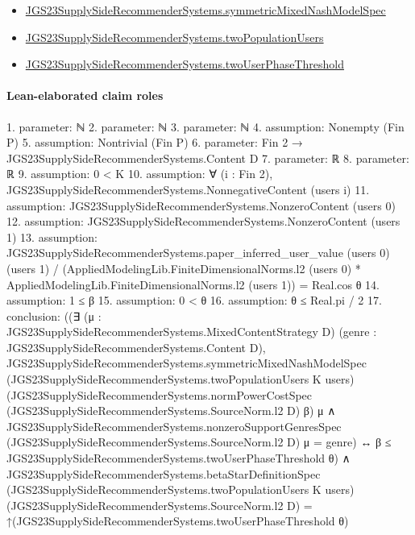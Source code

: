 \documentclass[10pt]{article}
\begin{document}
\begin{itemize}
\item \hyperlink{paper-prerequisite-b412efba7deb757f}{JGS23\allowbreak{}Supply\allowbreak{}Side\allowbreak{}Recommender\allowbreak{}Systems.\allowbreak{}symmetric\allowbreak{}Mixed\allowbreak{}Nash\allowbreak{}Model\allowbreak{}Spec}
\item \hyperlink{governing-declaration-43b84bc2140424db}{JGS23\allowbreak{}Supply\allowbreak{}Side\allowbreak{}Recommender\allowbreak{}Systems.\allowbreak{}two\allowbreak{}Population\allowbreak{}Users}
\item \hyperlink{governing-declaration-63bdc0df0d11c740}{JGS23\allowbreak{}Supply\allowbreak{}Side\allowbreak{}Recommender\allowbreak{}Systems.\allowbreak{}two\allowbreak{}User\allowbreak{}Phase\allowbreak{}Threshold}
\end{itemize}
\paragraph{Lean-elaborated claim roles}\begin{ReviewVerbatim}
1. parameter: ℕ
2. parameter: ℕ
3. parameter: ℕ
4. assumption: Nonempty (Fin P)
5. assumption: Nontrivial (Fin P)
6. parameter: Fin 2 → JGS23SupplySideRecommenderSystems.Content D
7. parameter: ℝ
8. parameter: ℝ
9. assumption: 0 < K
10. assumption: ∀ (i : Fin 2), JGS23SupplySideRecommenderSystems.NonnegativeContent (users i)
11. assumption: JGS23SupplySideRecommenderSystems.NonzeroContent (users 0)
12. assumption: JGS23SupplySideRecommenderSystems.NonzeroContent (users 1)
13. assumption: JGS23SupplySideRecommenderSystems.paper_inferred_user_value (users 0) (users 1) /
    (AppliedModelingLib.FiniteDimensionalNorms.l2 (users 0) * AppliedModelingLib.FiniteDimensionalNorms.l2 (users 1)) =
  Real.cos θ
14. assumption: 1 ≤ β
15. assumption: 0 < θ
16. assumption: θ ≤ Real.pi / 2
17. conclusion: ((∃ (μ : JGS23SupplySideRecommenderSystems.MixedContentStrategy D) (genre :
      JGS23SupplySideRecommenderSystems.Content D),
      JGS23SupplySideRecommenderSystems.symmetricMixedNashModelSpec
          (JGS23SupplySideRecommenderSystems.twoPopulationUsers K users)
          (JGS23SupplySideRecommenderSystems.normPowerCostSpec (JGS23SupplySideRecommenderSystems.SourceNorm.l2 D) β)
          μ ∧
        JGS23SupplySideRecommenderSystems.nonzeroSupportGenresSpec (JGS23SupplySideRecommenderSystems.SourceNorm.l2 D)
            μ =
          {genre}) ↔
    β ≤ JGS23SupplySideRecommenderSystems.twoUserPhaseThreshold θ) ∧
  JGS23SupplySideRecommenderSystems.betaStarDefinitionSpec
      (JGS23SupplySideRecommenderSystems.twoPopulationUsers K users)
      (JGS23SupplySideRecommenderSystems.SourceNorm.l2 D) =
    ↑(JGS23SupplySideRecommenderSystems.twoUserPhaseThreshold θ)
\end{ReviewVerbatim}
\end{document}
